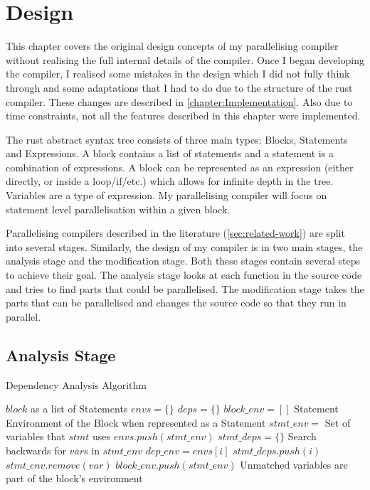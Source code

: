 \chapter{Design}
\label{chapter:Design}
This chapter covers the original design concepts of my parallelising compiler without realising the full internal details of the compiler. Once I began developing the compiler, I realised some mistakes in the design which I did not fully think through and some adaptations that I had to do due to the structure of the rust compiler. These changes are described in \autoref{chapter:Implementation}. Also due to time constraints, not all the features described in this chapter were implemented.

The rust abstract syntax tree consists of three main types: Blocks, Statements and Expressions. A block contains a list of statements and a statement is a combination of expressions. A block can be represented as an expression (either directly, or inside a loop/if/etc.) which allows for infinite depth in the tree. Variables are a type of expression. My parallelising compiler will focus on statement level parallelisation within a given block.

Parallelising compilers described in the literature (\autoref{sec:related-work}) are split into several stages. Similarly, the design of my compiler is in two main stages, the analysis stage and the modification stage. Both these stages contain several steps to achieve their goal. The analysis stage looks at each function in the source code and tries to find parts that could be parallelised. The modification stage takes the parts that can be parallelised and changes the source code so that they run in parallel.

\section{Analysis Stage}
\begin{algorithm}[H]
\caption{Dependency Analysis Algorithm}
\label{alg:dependency-analysis}
\begin{algorithmic}[1]
    \Require $block$ as a list of Statements
    \State $envs = \{\}$
    \State $deps = \{\}$
    \State $block\_env = []$ \Comment Statement Environment of the Block when represented as a Statement
        \State $stmt\_env =$ Set of variables that $stmt$ uses
        \State $envs.push(stmt\_env)$
        \State $stmt\_deps = \{\}$
         \Comment Search backwards for $var$s in $stmt\_env$
            \State $dep\_env = envs[i]$
                \State $stmt\_deps.push(i)$
                \State $stmt\_env.remove(var)$
            \EndFor
        \EndFor
        \State $block\_env.push(stmt\_env)$ \Comment Unmatched variables are part of the block's environment
    \EndFor
\end{algorithmic}
\end{algorithm}

